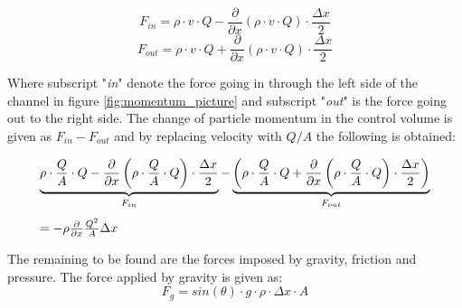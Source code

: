 \begin{equation}
	F_{in}= \rho \cdot v \cdot Q - \frac{\partial}{\partial x}(\rho \cdot v \cdot Q) \cdot \frac{\Delta x}{2}
\end{equation}
\begin{equation}
	F_{out} = \rho \cdot v \cdot Q + \frac{\partial}{\partial x}(\rho \cdot v \cdot Q) \cdot \frac{\Delta x}{2}
\end{equation}

Where subscript "\textit{in}" denote the force going in through the left side of the channel in figure \ref{fig:momentum_picture} and subscript "\textit{out}" is the force going out to the right side.%
 The change of particle momentum in the control volume is given as $F_{in}- F_{out}$ and by replacing velocity with $Q/A$ the following is obtained:

\begin{equation}\label{mass_flow_speed}
\begin{array}{l}
\underbrace{\rho \cdot \frac{Q}{A} \cdot Q - \frac{\partial}{\partial x}\left(\rho \cdot \frac{Q}{A}  \cdot Q\right) \cdot \frac{\Delta x}{2}}_{F_{in}} - %
\underbrace{\left(\rho \cdot \frac{Q}{A}  \cdot Q + \frac{\partial}{\partial x}\left(\rho \cdot \frac{Q}{A}  \cdot Q\right) \cdot \frac{\Delta x}{2} \right)}_{F_{out}} \vspace{3mm}\\ 
= -  \rho\frac{\partial}{\partial x} \frac{Q^2}{A}\Delta x
\end{array}
\end{equation}

The remaining to be found are the forces imposed by gravity, friction and pressure.
The force applied by gravity is given as:
\begin{equation}
F_g = sin(\theta)\cdot g \cdot \rho \cdot \Delta x \cdot A
\label{gravity_force} 
\end{equation}


